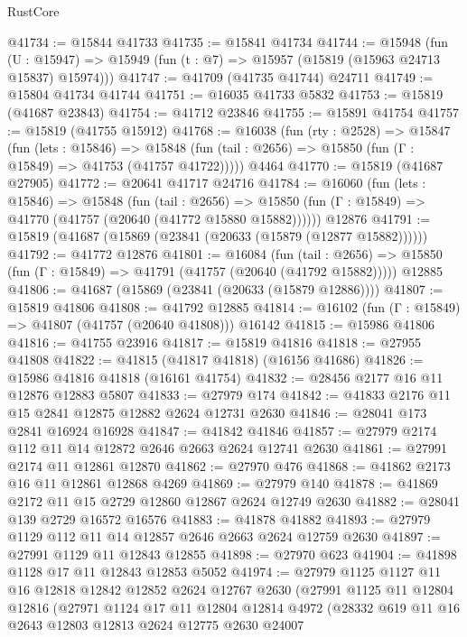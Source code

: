\begin{lexlean}{RustCore}
\begin{coremodule}
@41734 := @15844 @41733
@41735 := @15841 @41734
@41744 := @15948
    (fun (U : @15947) => @15949 (fun (t : @7) => @15957 (@15819 (@15963 @24713 @15837) @15974)))
@41747 := @41709 (@41735 @41744) @24711
@41749 := @15804 @41734 @41744
@41751 := @16035 @41733 @5832
@41753 := @15819 (@41687 @23843)
@41754 := @41712 @23846
@41755 := @15891 @41754
@41757 := @15819 (@41755 @15912)
@41768 := @16038
    (fun (rty : @2528) =>
    @15847
      (fun (lets : @15846) =>
      @15848 (fun (tail : @2656) => @15850 (fun (Γ : @15849) => @41753 (@41757 @41722)))))
    @4464
@41770 := @15819 (@41687 @27905)
@41772 := @20641 @41717 @24716
@41784 := @16060
    (fun (lets : @15846) =>
    @15848
      (fun (tail : @2656) =>
      @15850 (fun (Γ : @15849) => @41770 (@41757 (@20640 (@41772 @15880 @15882))))))
    @12876
@41791 := @15819 (@41687 (@15869 (@23841 (@20633 (@15879 (@12877 @15882))))))
@41792 := @41772 @12876
@41801 := @16084
    (fun (tail : @2656) => @15850 (fun (Γ : @15849) => @41791 (@41757 (@20640 (@41792 @15882)))))
    @12885
@41806 := @41687 (@15869 (@23841 (@20633 (@15879 @12886))))
@41807 := @15819 @41806
@41808 := @41792 @12885
@41814 := @16102 (fun (Γ : @15849) => @41807 (@41757 (@20640 @41808))) @16142
@41815 := @15986 @41806
@41816 := @41755 @23916
@41817 := @15819 @41816
@41818 := @27955 @41808
@41822 := @41815 (@41817 @41818) (@16156 @41686)
@41826 := @15986 @41816 @41818 (@16161 @41754)
@41832 := @28456 @2177 @16 @11 @12876 @12883 @5807
@41833 := @27979 @174
@41842 := @41833 @2176 @11 @15 @2841 @12875 @12882 @2624 @12731 @2630
@41846 := @28041 @173 @2841 @16924 @16928
@41847 := @41842 @41846
@41857 := @27979 @2174 @112 @11 @14 @12872 @2646 @2663 @2624 @12741 @2630
@41861 := @27991 @2174 @11 @12861 @12870
@41862 := @27970 @476
@41868 := @41862 @2173 @16 @11 @12861 @12868 @4269
@41869 := @27979 @140
@41878 := @41869 @2172 @11 @15 @2729 @12860 @12867 @2624 @12749 @2630
@41882 := @28041 @139 @2729 @16572 @16576
@41883 := @41878 @41882
@41893 := @27979 @1129 @112 @11 @14 @12857 @2646 @2663 @2624 @12759 @2630
@41897 := @27991 @1129 @11 @12843 @12855
@41898 := @27970 @623
@41904 := @41898 @1128 @17 @11 @12843 @12853 @5052
@41974 := @27979
    @1125
    @1127
    @11
    @16
    @12818
    @12842
    @12852
    @2624
    @12767
    @2630
    (@27991
      @1125
      @11
      @12804
      @12816
      (@27971
        @1124
        @17
        @11
        @12804
        @12814
        @4972
        (@28332
          @619
          @11
          @16
          @2643
          @12803
          @12813
          @2624
          @12775
          @2630
          @24007

\end{coremodule}
\end{lexlean}
